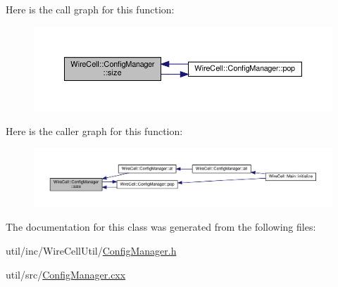 Here is the call graph for this function\+:
\nopagebreak
\begin{figure}[H]
\begin{center}
\leavevmode
\includegraphics[width=350pt]{class_wire_cell_1_1_config_manager_ad47aaaeff27496deac1eb2eae1bd01c8_cgraph}
\end{center}
\end{figure}
Here is the caller graph for this function\+:
\nopagebreak
\begin{figure}[H]
\begin{center}
\leavevmode
\includegraphics[width=350pt]{class_wire_cell_1_1_config_manager_ad47aaaeff27496deac1eb2eae1bd01c8_icgraph}
\end{center}
\end{figure}


The documentation for this class was generated from the following files\+:\begin{DoxyCompactItemize}
\item 
util/inc/\+Wire\+Cell\+Util/\hyperlink{_config_manager_8h}{Config\+Manager.\+h}\item 
util/src/\hyperlink{_config_manager_8cxx}{Config\+Manager.\+cxx}\end{DoxyCompactItemize}
